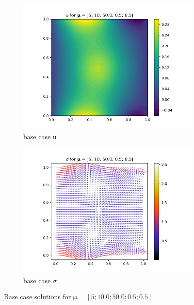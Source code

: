 \begin{figure}[!h]
        \begin{center}
	\begin{subfigure}{0.45\linewidth}
		\centering
		\includegraphics[width=\linewidth]{figs/mixed_u_base.png}
            \caption{base case u}
		\label{fig: base_u}
	\end{subfigure}
	\begin{subfigure}{0.45\linewidth}
		\centering
		\includegraphics[width=\linewidth]{figs/mixed_sigma_base.png}
            \caption{base case $\sigma$}
		\label{fig: base_sig}
	\end{subfigure}
	\caption{Base case solutions for $\bm{\mu} = [5; 10.0; 50.0; 0.5; 0.5]$}
	\label{fig: base}
        \end{center}
\end{figure}

